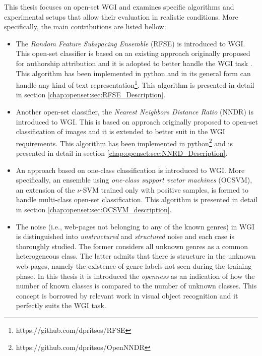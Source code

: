 \begin{itemize}
This thesis focuses on open-set WGI and examines specific algorithms and experimental setups that allow their evaluation in realistic conditions. More specifically, the main contributions are listed bellow:

\begin{itemize}
\item The \textit{Random Feature Subspacing Ensemble} (RFSE) is introduced to WGI. This open-set classifier is based on an existing approach originally proposed for authorship attribution and it is adopted to better handle the WGI task \parencite{koppel2011authorship}. This algorithm has been implemented in python and in its general form can handle any kind of text representation\footnote{https://github.com/dpritsos/RFSE}. This algorithm is presented in detail in section \ref{chap:openset:sec:RFSE_Description}.
\item Another open-set classifier, the \textit{Nearest Neighbors Distance Ratio} (NNDR) is introduced to WGI. This is based on approach originally proposed to open-set classification of images \parencite{mendesjunior2016} and it is extended to better suit in the WGI requirements. This algorithm has been implemented in python\footnote{https://github.com/dpritsos/OpenNNDR} and is presented in detail in section \ref{chap:openset:sec:NNRD_Description}.
\item An approach based on one-class classification is introduced to WGI. More specifically, an ensemble using \textit{one-class support vector machines} (OCSVM), an extension of the $\nu$-SVM trained only with positive samples, is formed to handle multi-class open-set classification. This algorithm is presented in detail in section \ref{chap:openset:sec:OCSVM_description}.
\item The noise (i.e., web-pages not belonging to any of the known genres) in WGI is distinguished into \textit{unstructured} and \textit{structured} noise and each case is thoroughly studied. The former considers all unknown genres as a common heterogeneous class. The latter admits that there is structure in the unknown web-pages, namely the existence of genre labels not seen during the training phase. In this thesis it is introduced the \textit{openness} as an indication of how the number of known classes is compared to the number of unknown classes. This concept is borrowed by relevant work in visual object recognition \parencite{scheirer2013toward} and it perfectly suits the WGI task.

\end{itemize}
\end{itemize}
